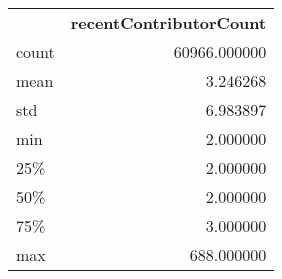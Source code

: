 \begin{tabular}{lr}
 & \textbf{recentContributorCount} \\
count & 60966.000000 \\
mean & 3.246268 \\
std & 6.983897 \\
min & 2.000000 \\
25\% & 2.000000 \\
50\% & 2.000000 \\
75\% & 3.000000 \\
max & 688.000000 \\
\end{tabular}
